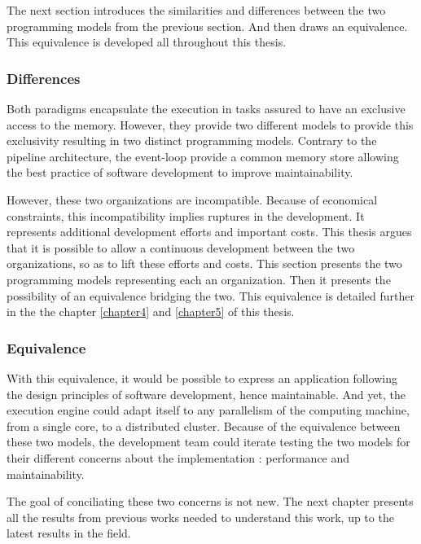 The next section introduces the similarities and differences between the two programming models from the previous section.
And then draws an equivalence.
This equivalence is developed all throughout this thesis.

\subsubsection{Differences}

Both paradigms encapsulate the execution in tasks assured to have an exclusive access to the memory.
However, they provide two different models to provide this exclusivity resulting in two distinct programming models.
Contrary to the pipeline architecture, the event-loop provide a common memory store allowing the best practice of software development to improve maintainability.

However, these two organizations are incompatible.
Because of economical constraints, this incompatibility implies ruptures in the development.
It represents additional development efforts and important costs.
This thesis argues that it is possible to allow a continuous development between the two organizations, so as to lift these efforts and costs.
This section presents the two programming models representing each an organization.
Then it presents the possibility of an equivalence bridging the two.
This equivalence is detailed further in the the chapter \ref{chapter4} and \ref{chapter5} of this thesis.

\subsubsection{Equivalence}

With this equivalence, it would be possible to express an application following the design principles of software development, hence maintainable.
And yet, the execution engine could adapt itself to any parallelism of the computing machine, from a single core, to a distributed cluster.
Because of the equivalence between these two models, the development team could iterate testing the two models for their different concerns about the implementation : performance and maintainability.

The goal of conciliating these two concerns is not new.
The next chapter presents all the results from previous works needed to understand this work, up to the latest results in the field.

\paragraph{}

